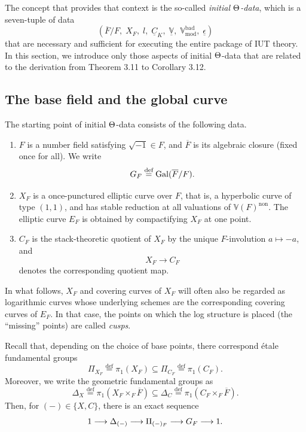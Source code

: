 \documentclass[12pt, reqno, a4paper]{amsart}
\def\udl#1{\underline{#1}} %
\def\ovl#1{\overline{#1}} %
\def\longto{\longrightarrow}
\def\eqdef{\stackrel{\textrm{def}}{=}} %
\def\bV{\mathbb{V}}
\def\uC{\udl{C}} %
\def\uV{\udl{\bV}} %
\def\ep{\epsilon} %
\def\uep{\udl{\ep}} %
\def\bad{\mathrm{bad}}
\DeclareMathOperator{\Gal}{Gal}
\DeclareMathOperator{\tmod}{mod}
\def\non{\mathrm{non}}
\begin{document}
The concept that provides that context is the so-called {\em initial \(\Th\)-data}, which is a seven-tuple of data
\begin{equation}\label{eqn:ITD}
  (\ovl{F}/F,\;X_F,\;l,\;\uC_K,\;\uV,\;\bV^{\bad}_{\tmod},\;\uep)
\end{equation}
that are necessary and sufficient for executing the entire package of IUT theory.
In this section, we introduce only those aspects of initial \(\Th\)-data that are related to the derivation from Theorem 3.11 to Corollary 3.12.

\subsection{The base field and the global curve}
The starting point of initial \(\Th\)-data consists of the following data.
\begin{enumerate}
\item[(a)] \(F\) is a number field satisfying \(\sqrt{-1}\in F\), and \(\ovl{F}\) is its algebraic closure (fixed once for all).
We write
\begin{equation*}
  \GG_F\eqdef\Gal(\ovl{F}/F).
\end{equation*}
\item[(b)] \(X_F\) is a once-punctured elliptic curve over \(F\), that is, a hyperbolic curve of type \((1,1)\), and has stable reduction at all valuations of \(\bV(F)^{\non}\).
The elliptic curve \(E_F\) is obtained by compactifying \(X_F\) at one point.
\item[(c)] \(C_F\) is the stack-theoretic quotient of \(X_F\) by the unique \(F\)-involution $a\mapsto -a$, and
\begin{equation}\label{eqn:X_FsurjtoC_F}
  X_F\longto C_F
\end{equation}
denotes the corresponding quotient map.
\end{enumerate}

\begin{rem}
In what follows, $X_F$ and covering curves of $X_F$ will often also be regarded as logarithmic curves whose underlying schemes are the corresponding covering curves of $E_F$.
In that case, the points on which the log structure is placed (the ``missing'' points) are called {\em cusps}.
\end{rem}




Recall that, depending on the choice of base points, there correspond {\'e}tale fundamental groups
\begin{equation*}
  \Pi_{X_F}\eqdef\pi_1(X_F)\subseteq
  \Pi_{C_F}\eqdef\pi_1(C_F).
\end{equation*}
Moreover, we write the geometric fundamental groups as
\begin{equation*}
  \Delta_X\eqdef\pi_1(X_F\times_F\ovl{F})\subseteq
  \Delta_C\eqdef\pi_1(C_F\times_F\ovl{F}).
\end{equation*}
Then, for \((- )\in\{X,C\}\), there is an exact sequence
\begin{equation*}
  1\longto \Delta_{(-)}\longto \Pi_{(-)_F}\longto \GG_F\longto 1.
\end{equation*}
\end{document}
